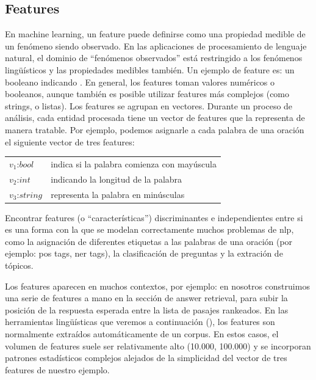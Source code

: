 \subsection*{Features}
\label{subsec:features}
En machine learning, un feature puede definirse como una propiedad medible de un fenómeno siendo observado. En las aplicaciones de procesamiento de lenguaje natural, el dominio de “fenómenos observados” está restringido a los fenómenos lingüísticos y las propiedades medibles también. Un ejemplo de feature es: un booleano indicando . En general, los features toman valores numéricos o booleanos, aunque también es posible utilizar features más complejos (como strings, o listas). Los features se agrupan en vectores. Durante un proceso de análisis, cada entidad procesada tiene un vector de features que la representa de manera tratable. Por ejemplo, podemos asignarle a cada palabra de una oración el siguiente vector de tres features:

\begin{center}
\begin{tabular}{ll}
$v_1$:$bool$ & indica si la palabra comienza con mayúscula \\
$v_2$:$int$ & indicando la longitud de la palabra \\
$v_3$:$string$ & representa la palabra en minúsculas \\
\end{tabular}
\end{center}


Encontrar features (o “características”) discriminantes e independientes entre si es una forma con la que se modelan correctamente muchos problemas de nlp, como la asignación de diferentes etiquetas a las palabras de una oración (por ejemplo: pos tags, ner tags), la clasificación de preguntas y la extración de tópicos. 

Los features aparecen en muchos contextos, por ejemplo: en  nosotros construimos una serie de features a mano en la sección de answer retrieval, para subir la posición de la respuesta esperada entre la lista de pasajes rankeados. En las herramientas lingüísticas que veremos a continuación (), los features son normalmente extraídos automáticamente de un corpus. En estos casos, el volumen de features suele ser relativamente alto (10.000, 100.000) y se incorporan patrones estadísticos complejos alejados de la simplicidad del vector de tres features de nuestro ejemplo. 

